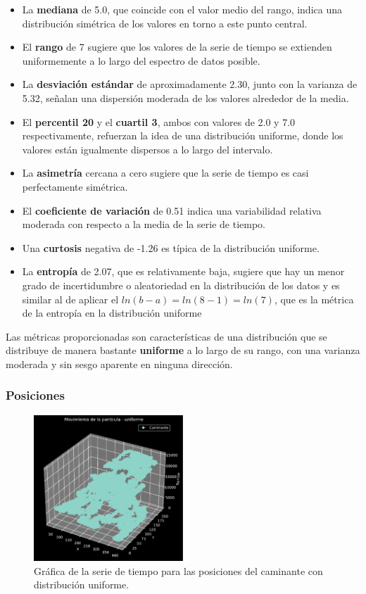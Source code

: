 \documentclass[11pt]{article} %
\begin{document}
	 \begin{itemize}
	 	\item La \textbf{mediana} de 5.0, que coincide con el valor medio del rango, indica una distribución simétrica de los valores en torno a este punto central.
	 	\item El \textbf{rango} de 7 sugiere que los valores de la serie de tiempo se extienden uniformemente a lo largo del espectro de datos posible.
	 	\item La \textbf{desviación estándar} de aproximadamente 2.30, junto con la varianza de 5.32, señalan una dispersión moderada de los valores alrededor de la media.
	 	\item El \textbf{percentil 20} y el \textbf{cuartil 3}, ambos con valores de 2.0 y 7.0 respectivamente, refuerzan la idea de una distribución uniforme, donde los valores están igualmente dispersos a lo largo del intervalo.
	 	\item La \textbf{asimetría} cercana a cero sugiere que la serie de tiempo es casi perfectamente simétrica.
	 	\item El \textbf{coeficiente de variación} de 0.51 indica una variabilidad relativa moderada con respecto a la media de la serie de tiempo.
	 	\item Una \textbf{curtosis} negativa de -1.26 es típica de la distribución uniforme.
	 	\item La \textbf{entropía} de 2.07, que es relativamente baja, sugiere que hay un menor grado de incertidumbre o aleatoriedad en la distribución de los datos y es similar al de aplicar el $ln(b-a) = ln(8-1)= ln(7)$, que es la métrica de la entropía en la distribución uniforme
	 \end{itemize}
	 
	 Las métricas proporcionadas son características de una distribución que se distribuye de manera bastante \textbf{uniforme} a lo largo de su rango, con una varianza moderada y sin sesgo aparente en ninguna dirección.
	 
	 
	 \subsubsection{Posiciones}
	 \begin{figure}[h]
	 	\centering
	 	\includegraphics[width=0.5\textwidth]{graf_posiciones_uniforme.pdf}
	 	\caption{Gráfica de la serie de tiempo para las posiciones del caminante con distribución uniforme.}
	 	\label{fig:posUnifGraf}
	 \end{figure}
	 
\end{document}
